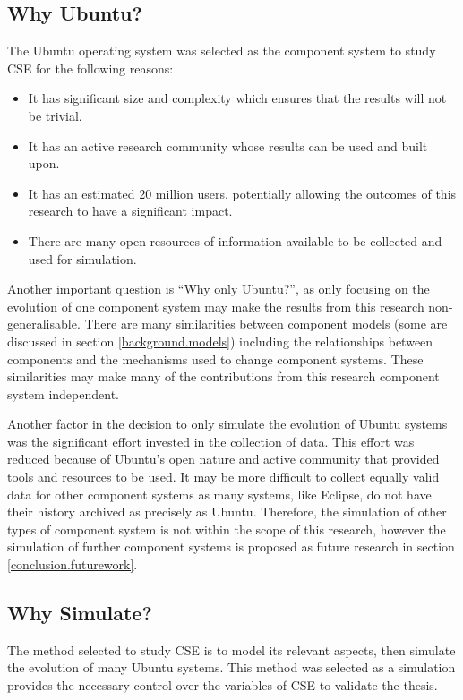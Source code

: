 \subsection{Why Ubuntu?}
The Ubuntu operating system was selected as the component system to study CSE for the following reasons:
\begin{itemize}
  \item It has significant size and complexity which ensures that the results will not be trivial.
  \item It has an active research community whose results can be used and built upon.
  \item It has an estimated 20 million users, potentially allowing the outcomes of this research to have a significant impact.
  \item There are many open resources of information available to be collected and used for simulation.
\end{itemize} 

Another important question is ``Why only Ubuntu?'', 
as only focusing on the evolution of one component system may make the results from this research non-generalisable.
There are many similarities between component models (some are discussed in section \ref{background.models})
including the relationships between components and the mechanisms used to change component systems.
These similarities may make many of the contributions from this research component system independent.

Another factor in the decision to only simulate the evolution of Ubuntu systems was the significant effort invested in the collection of data.
This effort was reduced because of Ubuntu's open nature and active community that provided tools and resources to be used.
It may be more difficult to collect equally valid data for other component systems as
many systems, like Eclipse, do not have their history archived as precisely as Ubuntu.
Therefore, the simulation of other types of component system is not within the scope of this research,
however the simulation of further component systems is proposed as future research in section \ref{conclusion.futurework}.

\subsection{Why Simulate?}
The method selected to study CSE is to model its relevant aspects, then simulate the evolution of many Ubuntu systems.
This method was selected as a simulation provides the necessary control over the variables of CSE to validate the thesis.


